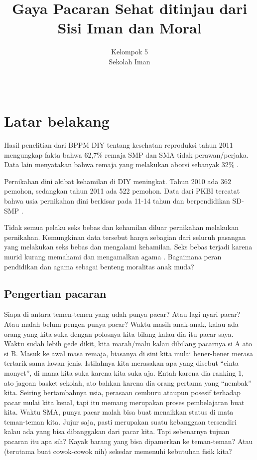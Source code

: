 \documentclass[a4paper,11pt,openany]{article}
\title{Gaya Pacaran Sehat ditinjau dari Sisi Iman dan Moral}
\author{Kelompok 5 \\ Sekolah Iman}
\date{~}
\begin{document}
\maketitle
\section*{Latar belakang}
Hasil penelitian dari BPPM DIY tentang kesehatan reproduksi tahun 2011 mengungkap fakta bahwa 62,7\% remaja SMP dan SMA tidak perawan/perjaka. Data lain menyatakan bahwa remaja yang melakukan aborsi sebanyak 32\% \cite{bppmdiy2011}.   

Pernikahan dini akibat kehamilan di DIY meningkat. Tahun 2010 ada 362 pemohon, sedangkan tahun 2011 ada 522 pemohon. Data dari PKBI tercatat bahwa usia pernikahan dini berkisar pada 11-14 tahun dan berpendidikan SD-SMP \citep{qardhawi2012}. 

Tidak semua pelaku seks bebas dan kehamilan diluar pernikahan melakukan pernikahan. Kemungkinan data tersebut hanya sebagian dari seluruh pasangan yang melakukan seks bebas dan mengalami kehamilan. 
Seks bebas terjadi karena murid kurang memahami dan mengamalkan agama \citep{qardhawi2012}. Bagaimana peran pendidikan dan agama sebagai benteng moralitas anak muda?


\subsection*{Pengertian pacaran}
Siapa di antara temen-temen yang udah punya pacar? Atau lagi nyari pacar? Atau malah belum pengen punya pacar? Waktu masih anak-anak, kalau ada orang yang kita suka dengan polosnya kita bilang kalau dia itu pacar saya. Waktu sudah lebih gede dikit, kita marah/malu kalau dibilang pacarnya si A ato si B. Masuk ke awal masa remaja, biasanya di sini kita mulai bener-bener merasa tertarik sama lawan jenis. Istilahnya kita merasakan apa yang disebut ``cinta monyet'', di mana kita suka karena kita suka aja. Entah karena dia ranking 1, ato jagoan basket sekolah, ato bahkan karena dia orang pertama yang ``nembak'' kita. Seiring bertambahnya usia, perasaan cemburu ataupun posesif terhadap pacar mulai kita kenal, tapi itu memang merupakan proses pembelajaran buat kita. Waktu SMA, punya pacar malah bisa buat menaikkan status di mata teman-teman kita. Jujur saja, pasti merupakan suatu kebanggaan tersendiri kalau ada yang bisa dibanggakan dari pacar kita. Tapi sebenarnya tujuan pacaran itu apa sih? Kayak barang yang bisa dipamerkan ke teman-teman? Atau (terutama buat cowok-cowok nih) sekedar memenuhi kebutuhan fisik kita?
\end{document}
